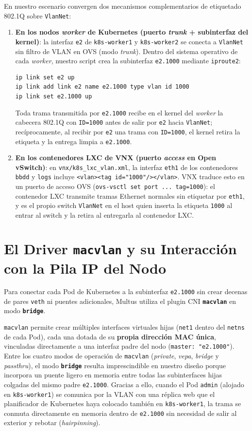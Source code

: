 En nuestro escenario convergen dos mecanismos complementarios de etiquetado 802.1Q sobre \texttt{VlanNet}:
\begin{enumerate}
  \item \textbf{En los nodos \textit{worker} de Kubernetes (puerto \textit{trunk} + subinterfaz del kernel)}: la interfaz \texttt{e2} de \texttt{k8s-worker1} y \texttt{k8s-worker2} se conecta a \texttt{VlanNet} sin filtro de VLAN en OVS (modo \textit{trunk}). Dentro del sistema operativo de cada \textit{worker}, nuestro script crea la subinterfaz \texttt{e2.1000} mediante \texttt{iproute2}:
\begin{lstlisting}[language=bash]
ip link set e2 up
ip link add link e2 name e2.1000 type vlan id 1000
ip link set e2.1000 up
\end{lstlisting}
  Toda trama transmitida por \texttt{e2.1000} recibe en el kernel del \textit{worker} la cabecera 802.1Q con \texttt{ID=1000} antes de salir por \texttt{e2} hacia \texttt{VlanNet}; recíprocamente, al recibir por \texttt{e2} una trama con \texttt{ID=1000}, el kernel retira la etiqueta y la entrega limpia a \texttt{e2.1000}.
  \item \textbf{En los contenedores LXC de VNX (puerto \textit{access} en Open vSwitch)}: en \texttt{vnx/k8s\_lxc\_vlan.xml}, la interfaz \texttt{eth1} de los contenedores \texttt{bbdd} y \texttt{logs} incluye \texttt{<vlan><tag id="1000"/></vlan>}. VNX traduce esto en un puerto de acceso OVS (\texttt{ovs-vsctl set port ... tag=1000}): el contenedor LXC transmite tramas Ethernet normales sin etiquetar por \texttt{eth1}, y es el propio switch \texttt{VlanNet} en el host quien inserta la etiqueta \texttt{1000} al entrar al switch y la retira al entregarla al contenedor LXC.
\end{enumerate}

\section{El Driver \texttt{macvlan} y su Interacción con la Pila IP del Nodo}

Para conectar cada Pod de Kubernetes a la subinterfaz \texttt{e2.1000} sin crear decenas de pares \texttt{veth} ni puentes adicionales, Multus utiliza el plugin CNI \textbf{\texttt{macvlan}} en modo \textbf{\texttt{bridge}}.

\texttt{macvlan} permite crear múltiples interfaces virtuales hijas (\texttt{net1} dentro del \texttt{netns} de cada Pod), cada una dotada de su \textbf{propia dirección MAC única}, vinculadas directamente a una interfaz padre del nodo (\texttt{master: "e2.1000"}). Entre los cuatro modos de operación de \texttt{macvlan} (\textit{private}, \textit{vepa}, \textit{bridge} y \textit{passthru}), el modo \textbf{\texttt{bridge}} resulta imprescindible en nuestro diseño porque incorpora un puente ligero en memoria entre todas las subinterfaces hijas colgadas del mismo padre \texttt{e2.1000}. Gracias a ello, cuando el Pod \texttt{admin} (alojado en \texttt{k8s-worker1}) se comunica por la VLAN con una réplica web que el planificador de Kubernetes haya colocado también en \texttt{k8s-worker1}, la trama se conmuta directamente en memoria dentro de \texttt{e2.1000} sin necesidad de salir al exterior y rebotar (\textit{hairpinning}).

